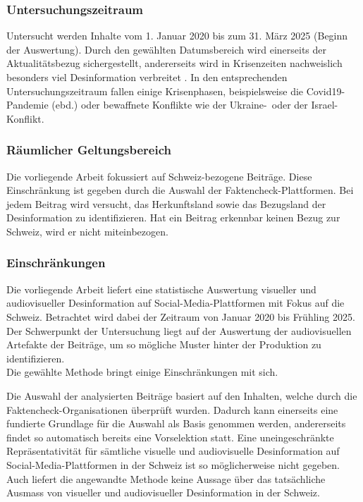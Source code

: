 \documentclass[12pt,a4paper]{article}        %
\begin{document}
\subsubsection{Untersuchungszeitraum}
Untersucht werden Inhalte vom 1. Januar 2020 bis zum 31. März 2025 (Beginn der Auswertung). Durch den gewählten Datumsbereich wird einerseits der Aktualitätsbezug sichergestellt, andererseits wird in Krisenzeiten nachweislich besonders viel Desinformation verbreitet \parencites{tandoc_jr_defining_2018}[Lim \& Ling (2018) zit.\ nach][2]{ceron_fake_2021}. In den entsprechenden Untersuchungszeitraum fallen einige Krisenphasen, beispielsweise die Covid19-Pandemie (ebd.) oder bewaffnete Konflikte wie der Ukraine-\ oder der Israel-Konflikt.
\subsubsection{Räumlicher Geltungsbereich}
Die vorliegende Arbeit fokussiert auf Schweiz-bezogene Beiträge. Diese Einschränkung ist gegeben durch die Auswahl der Faktencheck-Plattformen. Bei jedem Beitrag wird versucht, das Herkunftsland sowie das Bezugsland der Desinformation zu identifizieren. Hat ein Beitrag erkennbar keinen Bezug zur Schweiz, wird er nicht miteinbezogen.
\subsubsection{Einschränkungen}
Die vorliegende Arbeit liefert eine statistische Auswertung visueller und audiovisueller Desinformation auf Social-Media-Plattformen mit Fokus auf die Schweiz. Betrachtet wird dabei der Zeitraum von Januar 2020 bis Frühling 2025. Der Schwerpunkt der Untersuchung liegt auf der Auswertung der audiovisuellen Artefakte der Beiträge, um so mögliche Muster hinter der Produktion zu identifizieren.\\
Die gewählte Methode bringt einige Einschränkungen mit sich.

Die Auswahl der analysierten Beiträge basiert auf den Inhalten, welche durch die Faktencheck-Organisationen überprüft wurden. Dadurch kann einerseits eine fundierte Grundlage für die Auswahl als Basis genommen werden, andererseits findet so automatisch bereits eine Vorselektion statt. Eine uneingeschränkte Repräsentativität für sämtliche visuelle und audiovisuelle Desinformation auf Social-Media-Plattformen in der Schweiz ist so möglicherweise nicht gegeben. Auch liefert die angewandte Methode keine Aussage über das tatsächliche Ausmass von visueller und audiovisueller Desinformation in der Schweiz.
\end{document}

